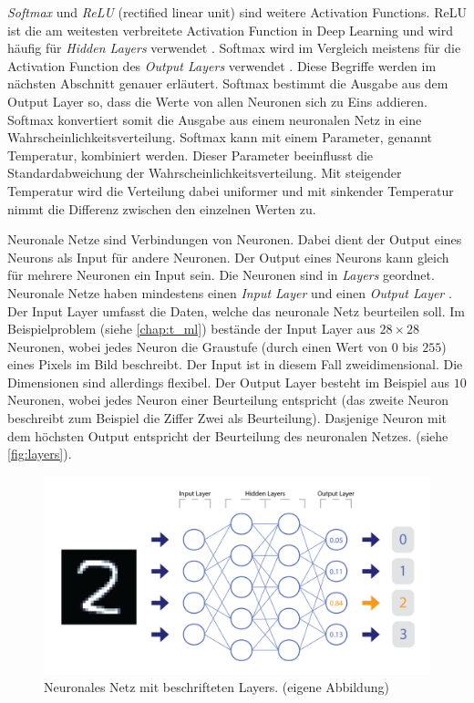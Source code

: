 \emph{Softmax} und \emph{ReLU} (rectified linear unit) sind weitere Activation
Functions. ReLU ist die am weitesten verbreitete Activation Function in Deep
Learning und wird häufig für \emph{Hidden Layers} verwendet
\cite{agarap_deep_2019}. Softmax wird im Vergleich meistens für die Activation
Function des \emph{Output Layers} verwendet \cite{koech_softmax_2021}. Diese
Begriffe werden im nächsten Abschnitt genauer erläutert. Softmax bestimmt die
Ausgabe aus dem Output Layer so, dass die Werte von allen Neuronen sich zu Eins
addieren. Softmax konvertiert somit die Ausgabe aus einem neuronalen Netz in
eine Wahrscheinlichkeitsverteilung. Softmax kann mit einem Parameter, genannt
Temperatur, kombiniert werden. Dieser Parameter beeinflusst die
Standardabweichung der Wahrscheinlichkeitsverteilung. Mit steigender Temperatur
wird die Verteilung dabei uniformer und mit sinkender Temperatur nimmt die
Differenz zwischen den einzelnen Werten zu.

Neuronale Netze sind Verbindungen von Neuronen. Dabei dient der Output eines
Neurons als Input für andere Neuronen. Der Output eines Neurons kann gleich für
mehrere Neuronen ein Input sein. Die Neuronen sind in \emph{Layers} geordnet.
Neuronale Netze haben mindestens einen \emph{Input Layer} und einen \emph{Output
Layer} \cite{nielsen_neural_2015}. Der Input Layer umfasst die Daten, welche das
neuronale Netz beurteilen soll. Im Beispielproblem (siehe \ref{chap:t_ml})
bestände der Input Layer aus $28\times28$ Neuronen, wobei jedes Neuron die
Graustufe (durch einen Wert von $0$ bis $255$) eines Pixels im Bild beschreibt.
Der Input ist in diesem Fall zweidimensional. Die Dimensionen sind allerdings
flexibel. Der Output Layer besteht im Beispiel aus $10$ Neuronen, wobei jedes
Neuron einer Beurteilung entspricht (das zweite Neuron beschreibt zum Beispiel
die Ziffer Zwei als Beurteilung). Dasjenige Neuron mit dem höchsten Output
entspricht der Beurteilung des neuronalen Netzes. (siehe \autoref{fig:layers}).

\newpage
\begin{figure}[!ht]
   \centering
   \includegraphics[width=\textwidth-2cm]{images/theorie/layers.png}
   \caption{Neuronales Netz mit beschrifteten Layers. (eigene Abbildung)}\label{fig:layers}
\end{figure}
 
